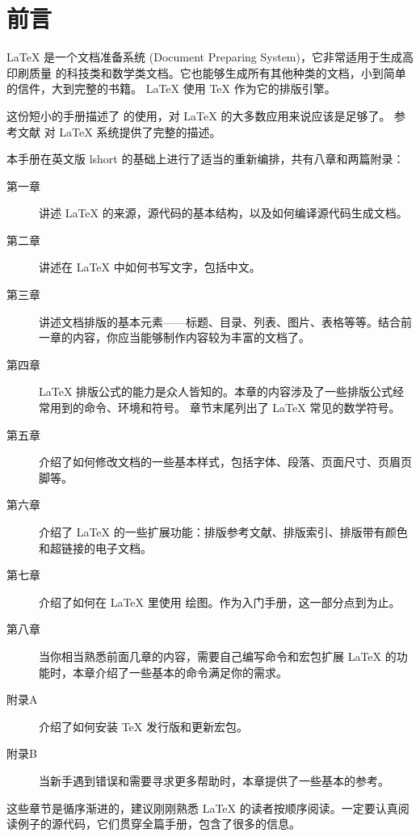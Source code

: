 \chapter{前言}

\LaTeX{} \cite{manual} 是一个文档准备系统 (Document Preparing System)，它非常适用于生成高印刷质量
的科技类和数学类文档。它也能够生成所有其他种类的文档，小到简单的信件，大到完整的书籍。
\LaTeX{} 使用 \TeX{} \cite{texbook} 作为它的排版引擎。

这份短小的手册描述了 \LaTeXe{} 的使用，对 \LaTeX{} 的大多数应用来说应该是足够了。
参考文献 \cite{manual,companion} 对 \LaTeX{} 系统提供了完整的描述。

\bigskip
本手册在英文版 lshort 的基础上进行了适当的重新编排，共有八章和两篇附录：
\begin{description}
  \item[第一章] 讲述 \LaTeX{} 的来源，源代码的基本结构，以及如何编译源代码生成文档。
  \item[第二章] 讲述在 \LaTeX{} 中如何书写文字，包括中文。
  \item[第三章] 讲述文档排版的基本元素——标题、目录、列表、图片、表格等等。结合前一章的内容，你应当能够制作内容较为丰富的文档了。
  \item[第四章] \LaTeX{} 排版公式的能力是众人皆知的。本章的内容涉及了一些排版公式经常用到的命令、环境和符号。
                章节末尾列出了 \LaTeX{} 常见的数学符号。
  \item[第五章] 介绍了如何修改文档的一些基本样式，包括字体、段落、页面尺寸、页眉页脚等。
  \item[第六章] 介绍了 \LaTeX{} 的一些扩展功能：排版参考文献、排版索引、排版带有颜色和超链接的电子文档。
  \item[第七章] 介绍了如何在 \LaTeX{} 里使用  绘图。作为入门手册，这一部分点到为止。
  \item[第八章] 当你相当熟悉前面几章的内容，需要自己编写命令和宏包扩展 \LaTeX{} 的功能时，本章介绍了一些基本的命令满足你的需求。
\end{description}
\begin{description}
  \item[附录A] 介绍了如何安装 \TeX{} 发行版和更新宏包。
  \item[附录B] 当新手遇到错误和需要寻求更多帮助时，本章提供了一些基本的参考。
\end{description}

\bigskip
这些章节是循序渐进的，建议刚刚熟悉 \LaTeX{} 的读者按顺序阅读。一定要认真阅读例子的源代码，它们贯穿全篇手册，包含了很多的信息。

